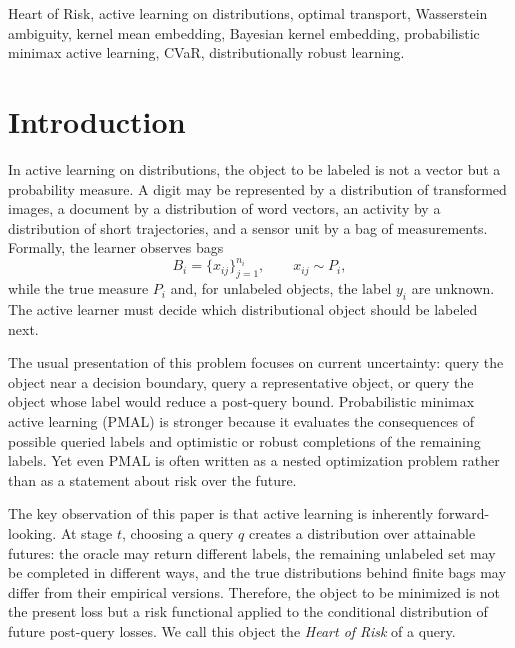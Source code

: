 \documentclass[10pt,journal]{IEEEtran}
\begin{document}
\begin{IEEEkeywords}
Heart of Risk, active learning on distributions, optimal transport, Wasserstein ambiguity, kernel mean embedding, Bayesian kernel embedding, probabilistic minimax active learning, CVaR, distributionally robust learning.
\end{IEEEkeywords}

\section{Introduction}
\label{sec:introduction}

In active learning on distributions, the object to be labeled is not a vector but a probability measure. A digit may be represented by a distribution of transformed images, a document by a distribution of word vectors, an activity by a distribution of short trajectories, and a sensor unit by a bag of measurements. Formally, the learner observes bags
\begin{equation}
    B_i=\{x_{ij}\}_{j=1}^{n_i}, \qquad x_{ij}\sim P_i,
\end{equation}
while the true measure $P_i$ and, for unlabeled objects, the label $y_i$ are unknown. The active learner must decide which distributional object should be labeled next.

The usual presentation of this problem focuses on current uncertainty: query the object near a decision boundary, query a representative object, or query the object whose label would reduce a post-query bound. Probabilistic minimax active learning (PMAL) is stronger because it evaluates the consequences of possible queried labels and optimistic or robust completions of the remaining labels. Yet even PMAL is often written as a nested optimization problem rather than as a statement about risk over the future.

The key observation of this paper is that active learning is inherently forward-looking. At stage $t$, choosing a query $q$ creates a distribution over attainable futures: the oracle may return different labels, the remaining unlabeled set may be completed in different ways, and the true distributions behind finite bags may differ from their empirical versions. Therefore, the object to be minimized is not the present loss but a risk functional applied to the conditional distribution of future post-query losses. We call this object the \emph{Heart of Risk} of a query.
\end{document}
